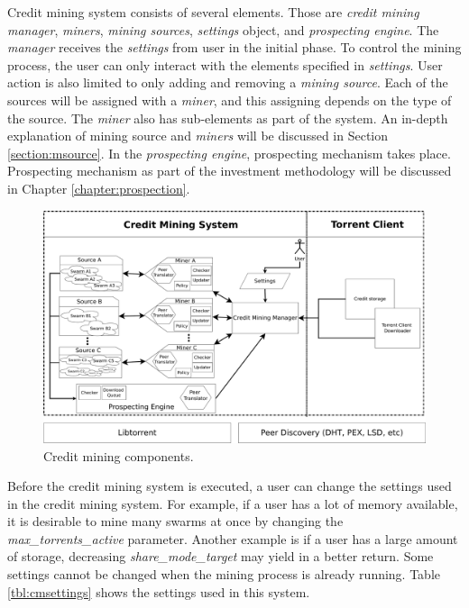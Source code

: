 Credit mining system consists of several elements. Those are \textit{credit mining manager}, \textit{miners}, \textit{mining sources}, \textit{settings} object, and \textit{prospecting engine}. The \textit{manager} receives the \textit{settings} from user in the initial phase. To control the mining process, the user can only interact with the elements specified in \textit{settings}. User action is also limited to only adding and removing a \textit{mining source}. Each of the sources will be assigned with a \textit{miner}, and this assigning depends on the type of the source. The \textit{miner} also has sub-elements as part of the system. An in-depth explanation of mining source and \textit{miners} will be discussed in Section \ref{section:msource}. In the \textit{prospecting engine}, prospecting mechanism takes place. Prospecting mechanism as part of the investment methodology will be discussed in Chapter \ref{chapter:prospection}.

\begin{figure}[ht]
	\centering
 	\includegraphics[width=\textwidth]{pics/cm_components.pdf}
	\caption{Credit mining components.}
	\label{fig:cmcomponents}
\end{figure}

Before the credit mining system is executed, a user can change the settings used in the credit mining system. For example, if a user has a lot of memory available, it is desirable to mine many swarms at once by changing the \textit{max\_torrents\_active} parameter. Another example is if a user has a large amount of storage, decreasing \textit{share\_mode\_target} may yield in a better return. Some settings cannot be changed when the mining process is already running. Table \ref{tbl:cmsettings} shows the settings used in this system. 

